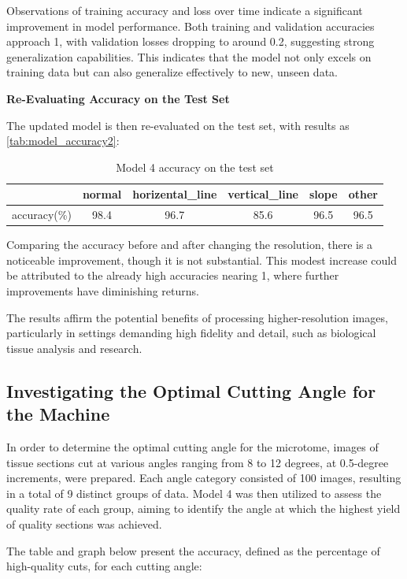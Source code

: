 Observations of training accuracy and loss over time indicate a significant improvement in model performance. Both training and validation accuracies approach 1, with validation losses dropping to around 0.2, suggesting strong generalization capabilities. This indicates that the model not only excels on training data but can also generalize effectively to new, unseen data.

\textbf{Re-Evaluating Accuracy on the Test Set}

The updated model is then re-evaluated on the test set, with results as \autoref{tab:model_accuracy2}:

\begin{table}
    \centering
    \caption{Model 4 accuracy on the test set}
    \begin{tabular}{cccccc}
        \toprule
        & normal & horizental\_line & vertical\_line & slope & other \\
        \midrule
        accuracy(\%) & 98.4 & 96.7 & 85.6 & 96.5 & 96.5 \\
        \bottomrule
    \end{tabular}
    \label{tab:model_accuracy2}
    \end{table}

Comparing the accuracy before and after changing the resolution, there is a noticeable improvement, though it is not substantial. This modest increase could be attributed to the already high accuracies nearing 1, where further improvements have diminishing returns.

The results affirm the potential benefits of processing higher-resolution images, particularly in settings demanding high fidelity and detail, such as biological tissue analysis and research.

\subsection{Investigating the Optimal Cutting Angle for the Machine}

In order to determine the optimal cutting angle for the microtome, images of tissue sections cut at various angles ranging from 8 to 12 degrees, at 0.5-degree increments, were prepared. Each angle category consisted of 100 images, resulting in a total of 9 distinct groups of data. Model 4 was then utilized to assess the quality rate of each group, aiming to identify the angle at which the highest yield of quality sections was achieved.

The table and graph below present the accuracy, defined as the percentage of high-quality cuts, for each cutting angle:

